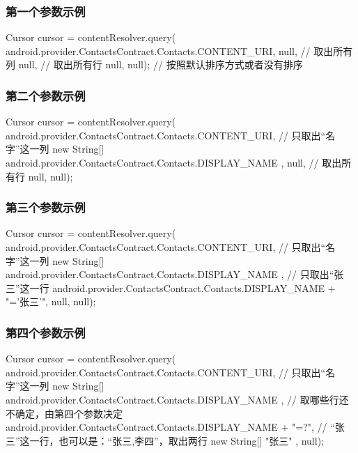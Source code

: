 ﻿\documentclass[a4paper,11pt]{article}
\begin{document}
\subsubsection[第一个参数示例]{第一个参数示例}
\begin{javacode}
Cursor cursor = contentResolver.query(
    android.provider.ContactsContract.Contacts.CONTENT_URI,
    null, // 取出所有列
    null, // 取出所有行
    null,
    null); // 按照默认排序方式或者没有排序
\end{javacode}

\subsubsection[第二个参数示例]{第二个参数示例}
\begin{javacode}
Cursor cursor = contentResolver.query(
    android.provider.ContactsContract.Contacts.CONTENT_URI,
    // 只取出“名字”这一列
    new String[]{ android.provider.ContactsContract.Contacts.DISPLAY_NAME },
    null, // 取出所有行
    null,
    null);  
\end{javacode}

\subsubsection[第三个参数示例]{第三个参数示例}
\begin{javacode}
Cursor cursor = contentResolver.query(
    android.provider.ContactsContract.Contacts.CONTENT_URI,
    // 只取出“名字”这一列
    new String[]{ android.provider.ContactsContract.Contacts.DISPLAY_NAME },
    // 只取出“张三”这一行
    android.provider.ContactsContract.Contacts.DISPLAY_NAME + "='张三'",
    null,
    null);
\end{javacode}

\subsubsection[第四个参数示例]{第四个参数示例}
\begin{javacode}
Cursor cursor = contentResolver.query(
    android.provider.ContactsContract.Contacts.CONTENT_URI,
    // 只取出“名字”这一列
    new String[]{ android.provider.ContactsContract.Contacts.DISPLAY_NAME },
    // 取哪些行还不确定，由第四个参数决定
    android.provider.ContactsContract.Contacts.DISPLAY_NAME + "=?",
    // “张三”这一行，也可以是：“张三,李四”，取出两行
    new String[]{ "张三" },
    null);  
\end{javacode}
\end{document}
